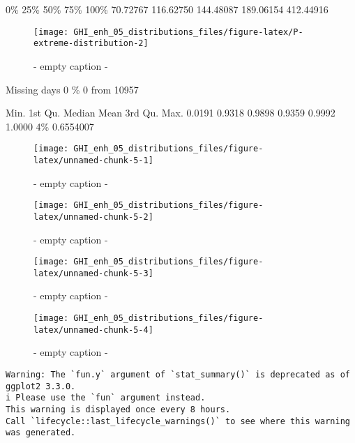 \documentclass[
  10pt,
  a4paper,oneside]{article}
\begin{document}
0\% 25\% 50\% 75\% 100\%
70.72767 116.62750 144.48087 189.06154 412.44916

\begin{figure}[H]

{\centering \texttt{[image: GHI\_enh\_05\_distributions\_files/figure-latex/P-extreme-distribution-2]} 

}

\caption{ - empty caption - }\label{fig:P-extreme-distribution-2}
\end{figure}

Missing days 0 \% 0 from 10957

Min. 1st Qu. Median Mean 3rd Qu. Max.
0.0191 0.9318 0.9898 0.9359 0.9992 1.0000
4\%
0.6554007

\begin{figure}[H]

{\centering \texttt{[image: GHI\_enh\_05\_distributions\_files/figure-latex/unnamed-chunk-5-1]} 

}

\caption{ - empty caption - }\label{fig:unnamed-chunk-5-1}
\end{figure}
\begin{figure}[H]

{\centering \texttt{[image: GHI\_enh\_05\_distributions\_files/figure-latex/unnamed-chunk-5-2]} 

}

\caption{ - empty caption - }\label{fig:unnamed-chunk-5-2}
\end{figure}
\begin{figure}[H]

{\centering \texttt{[image: GHI\_enh\_05\_distributions\_files/figure-latex/unnamed-chunk-5-3]} 

}

\caption{ - empty caption - }\label{fig:unnamed-chunk-5-3}
\end{figure}
\begin{figure}[H]

{\centering \texttt{[image: GHI\_enh\_05\_distributions\_files/figure-latex/unnamed-chunk-5-4]} 

}

\caption{ - empty caption - }\label{fig:unnamed-chunk-5-4}
\end{figure}

\begin{verbatim}
Warning: The `fun.y` argument of `stat_summary()` is deprecated as of ggplot2 3.3.0.
i Please use the `fun` argument instead.
This warning is displayed once every 8 hours.
Call `lifecycle::last_lifecycle_warnings()` to see where this warning was generated.
\end{verbatim}
\end{document}

